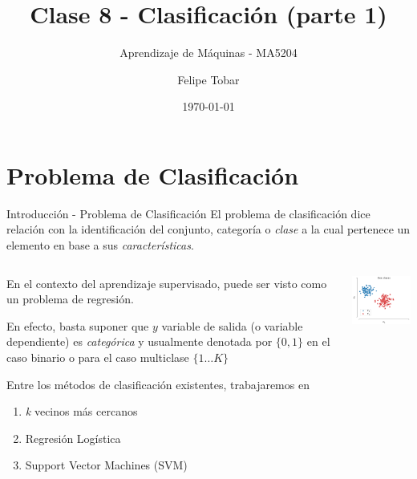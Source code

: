 \documentclass[9pt]{beamer}
\title{Clase 8 - Clasificación (parte 1)}
\subtitle{Aprendizaje de Máquinas - MA5204}
\date{\today}
\author{Felipe Tobar}
\institute{Department of Mathematical Engineering \&\\ Center for Mathematical Modelling\\Universidad de Chile}
\begin{document}
\begin{frame}
  \titlepage
\end{frame}

\section{Problema de Clasificación}
\begin{frame}{Introducción - Problema de Clasificación}
El problema de clasificación dice relación con la identificación del conjunto, categoría o \emph{clase} a la cual pertenece un elemento en base a sus \emph{características}. \vspace{0.5cm} \pause

\begin{columns}

  \begin{column}{0.5\textwidth}
    En el contexto del aprendizaje supervisado, puede ser visto como un problema de regresión. \vspace{0.5cm} \pause

    En efecto, basta suponer que $y$ variable de salida (o variable dependiente) es \emph{categórica} y usualmente denotada por $\{ 0 , 1 \}$ en el caso binario o para el caso multiclase $\{ 1 \dots K \}$ \vspace{0.5cm} \pause

    Entre los métodos de clasificación existentes, trabajaremos en 

    \begin{enumerate}
      \item \emph{k} vecinos más cercanos \pause
      \item Regresión Logística \pause
      \item Support Vector Machines (SVM) \pause

    \end{enumerate}


  \end{column}

  \begin{column}{0.5\textwidth}
    \centering
    \includegraphics[width=5cm]{../img/cap3_dosclases.pdf}\\
    \label{fig:puntos_2d}
  \end{column}


\end{columns}


\end{frame}
\end{document}
